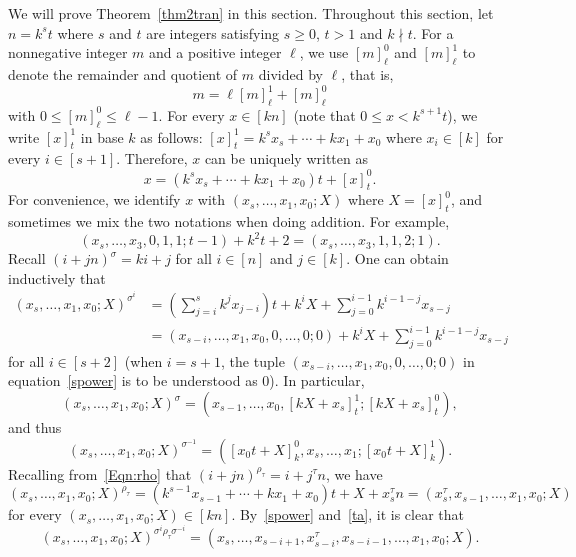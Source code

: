 \documentclass[11pt,a4paper,reqno]{amsart}
\theoremstyle{definition}
\begin{document}
We will prove Theorem~\ref{thm2tran} in this section.
Throughout this section, let $n=k^st$ where $s$ and $t$ are integers satisfying $s\geq 0$, $t>1$ and $k\nmid t$. For a nonnegative integer $m$ and a positive integer $\ell$, we use $[m]_{\ell}^{0}$ and $[m]_{\ell}^{1}$ to denote the remainder and quotient of $m$ divided by $\ell$, that is,
\[
m=\ell[m]_{\ell}^{1}+[m]_{\ell}^{0}
\]
with $0\leq[m]_{\ell}^{0}\leq\ell-1$.
For every $x\in[kn]$ (note that $0\le x<k^{s+1}t$), we write $[x]_{t}^{1}$ in base $k$ as follows: $[x]_{t}^{1}=k^sx_s+\cdots+kx_1+x_0$ where $x_i\in[k]$ for every $i\in[s+1]$. Therefore, $x$ can be uniquely written as
\begin{equation*}
x=(k^sx_s+\cdots+kx_1+x_0)t+[x]_{t}^{0}.
\end{equation*}
For convenience, we identify $x$ with $(x_s,\ldots,x_1,x_0;X)$ where $X=[x]_{t}^{0}$, and sometimes we mix the two notations when doing addition.
For example,
\begin{equation*}
(x_s,\ldots,x_3,0,1,1;t-1)+k^2t+2=(x_s,\ldots,x_3,1,1,2;1).
\end{equation*}
Recall $(i+jn)^{\sigma}=ki+j$ for all $i\in[n]$ and $j\in[k]$. One can obtain inductively that
\begin{align}
  (x_s,\ldots,x_1,x_0;X)^{\sigma^{i}}  &= \left(\sum_{j=i}^s k^{j}x_{j-i}\right)t+k^iX+\sum_{j=0}^{i-1}k^{i-1-j}x_{s-j}\nonumber\\
  &=(x_{s-i},\ldots,x_1,x_0,0,\ldots,0;0)+k^iX+\sum_{j=0}^{i-1}k^{i-1-j}x_{s-j}\label{spower}
\end{align}
for all $i\in [s+2]$ (when $i=s+1$, the tuple $(x_{s-i},\ldots,x_1,x_0,0,\ldots,0;0)$ in equation~\eqref{spower} is to be understood as $0$). In particular,
\begin{equation}\label{eq:sigmai}
     (x_s,\ldots,x_1,x_0;X)^{\sigma}=(x_{s-1},\ldots,x_0,[kX+x_s]_{t}^{1};[kX+x_s]_{t}^{0}),
\end{equation}
and thus
\begin{equation}\label{inverse}
(x_s,\ldots,x_1,x_0;X)^{\sigma^{-1}}=([x_0t+X]_{k}^{0},x_{s},\ldots,x_1;[x_0t+X]_{k}^{1}).
\end{equation}
Recalling from~\eqref{Eqn:rho} that $(i+jn)^{\rho_{\tau}}=i+j^{\tau}n$,
we have
\begin{equation}\label{ta}
(x_s,\ldots,x_1,x_0;X)^{\rho_{\tau}}=(k^{s-1}x_{s-1}+\cdots+kx_1+x_0)t+X+x_s^\tau n=(x_{s}^{\tau},x_{s-1},\ldots,x_1,x_0;X)
\end{equation}
for every $(x_s,\ldots,x_1,x_0;X)\in[kn]$. By~\eqref{spower} and~\eqref{ta}, it is clear that
\begin{equation}
\label{tau}
(x_s,\ldots,x_1,x_0;X)^{\sigma^{i}\rho_{\tau}\sigma^{-i}}
=(x_s,\ldots,x_{s-i+1},x_{s-i}^{\tau},x_{s-i-1},
\ldots,x_1,x_0;X).
\end{equation}
\end{document}
